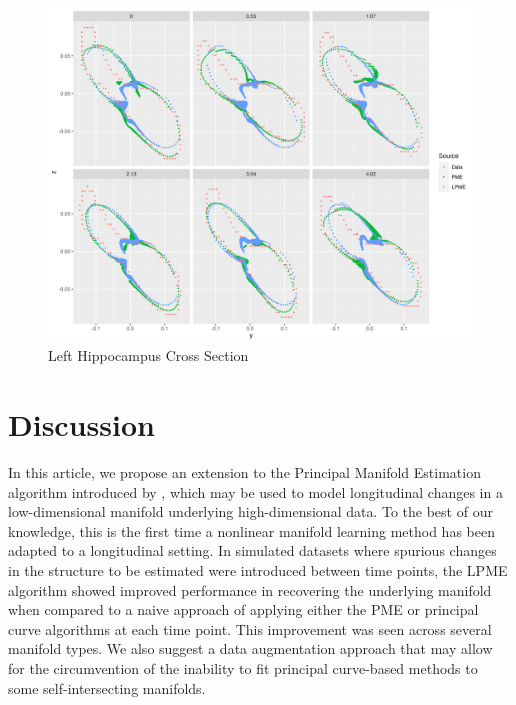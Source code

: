 \documentclass[11pt,reqno]{article}
\renewcommand{\textwidth}{180mm}
\theoremstyle{definition}
\begin{document}
\begin{figure}[h]
  \centering
  \includegraphics[width=\textwidth]{adni_lhipp_cross_section}
  \caption{Left Hippocampus Cross Section}
  \label{fig:adni_cross_section}
\end{figure}

\section{Discussion}\label{s:discussion}

In this article, we propose an extension to the Principal Manifold Estimation algorithm introduced by \cite{mengPrincipalManifoldEstimation2021}, which may be used to model longitudinal changes in a low-dimensional manifold underlying high-dimensional data. To the best of our knowledge, this is the first time a nonlinear manifold learning method has been adapted to a longitudinal setting. In simulated datasets where spurious changes in the structure to be estimated were introduced between time points, the LPME algorithm showed improved performance in recovering the underlying manifold when compared to a naive approach of applying either the PME or principal curve algorithms at each time point. This improvement was seen across several manifold types. We also suggest a data augmentation approach that may allow for the circumvention of the inability to fit principal curve-based methods to some self-intersecting manifolds. 
\end{document}
